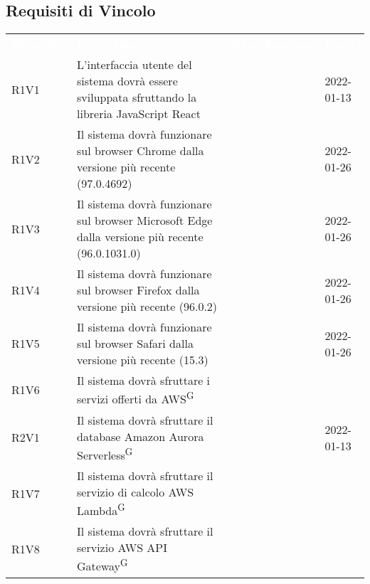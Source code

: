 \subsection{Requisiti di Vincolo}


\renewcommand{\arraystretch}{1.5}
\begin{longtable}{ m{}<{\centering}  m{}<{\centering}  m{}<{\centering}  m{}<{\centering}}
	\rowcolor{darkblue}
	\textcolor{white}{\textbf{Requisito}} &\textcolor{white}{\textbf{Descrizione}}& \textcolor{white}{\textbf{Classificazione}} & \textcolor{white}{\textbf{Fonti}}\\ 

	R1V1 & L’interfaccia utente del sistema dovrà essere sviluppata sfruttando la libreria JavaScript React & \Ob & \Vi{} 2022-01-13 \\	

	R1V2 & Il sistema dovrà funzionare sul browser Chrome dalla versione più recente (97.0.4692) & \Ob & \Ve{} 2022-01-26 \\	
	 
	R1V3 & Il sistema dovrà funzionare sul browser Microsoft Edge dalla versione più recente (96.0.1031.0) & \Ob & \Ve{} 2022-01-26 \\	

	R1V4 & Il sistema dovrà funzionare sul browser Firefox dalla versione più recente (96.0.2) & \Ob & \Ve{} 2022-01-26 \\	
	 
	R1V5 & Il sistema dovrà funzionare sul browser Safari dalla versione più recente (15.3) & \Ob & \Ve{} 2022-01-26 \\	
	 
	R1V6 & Il sistema dovrà sfruttare i servizi offerti da AWS\textsuperscript{G} & \Ob & \Ca \\	
	 
	R2V1 & Il sistema dovrà sfruttare il database Amazon Aurora Serverless\textsuperscript{G} & \De & \Vi{} 2022-01-13 \\
	
	R1V7 & Il sistema dovrà sfruttare il servizio di calcolo AWS Lambda\textsuperscript{G} & \Ob & \Ca \\	
	 
	R1V8 & Il sistema dovrà sfruttare il servizio AWS API Gateway\textsuperscript{G} & \Ob & \Ca \\
	

\end{longtable}
